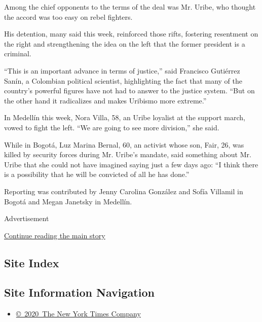 Among the chief opponents to the terms of the deal was Mr. Uribe, who
thought the accord was too easy on rebel fighters.

His detention, many said this week, reinforced those rifts, fostering
resentment on the right and strengthening the idea on the left that the
former president is a criminal.

``This is an important advance in terms of justice,'' said Francisco
Gutiérrez Sanín, a Colombian political scientist, highlighting the fact
that many of the country's powerful figures have not had to answer to
the justice system. ``But on the other hand it radicalizes and makes
Uribismo more extreme.''

In Medellín this week, Nora Villa, 58, an Uribe loyalist at the support
march, vowed to fight the left. ``We are going to see more division,''
she said.

While in Bogotá, Luz Marina Bernal, 60, an activist whose son, Fair, 26,
was killed by security forces during Mr. Uribe's mandate, said something
about Mr. Uribe that she could not have imagined saying just a few days
ago: ``I think there is a possibility that he will be convicted of all
he has done.''

Reporting was contributed by Jenny Carolina González and Sofía Villamil
in Bogotá and Megan Janetsky in Medellín.

Advertisement

\protect\hyperlink{after-bottom}{Continue reading the main story}

\hypertarget{site-index}{%
\subsection{Site Index}\label{site-index}}

\hypertarget{site-information-navigation}{%
\subsection{Site Information
Navigation}\label{site-information-navigation}}

\begin{itemize}
\tightlist
\item
  \href{https://help.nytimes.com/hc/en-us/articles/115014792127-Copyright-notice}{©~2020~The
  New York Times Company}
\end{itemize}

